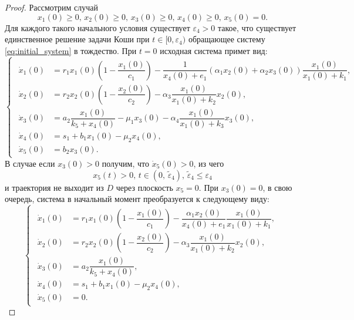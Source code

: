\documentclass[14pt,a4paper]{extarticle}
\begin{document}
\begin{proof}
		Рассмотрим случай 
		\begin{equation}\label{eq:conds_4}
			x_1(0)\ge0,\, x_2(0)\ge0,\, x_3(0)\ge0,\, x_4(0)\ge0,\, x_5(0)=0.
		\end{equation}
		Для каждого такого начального условия существует $\varepsilon_4>0$ такое, что существует единственное решение задачи Коши при $t\in[0,\varepsilon_4)$ обращающее систему \ref{eq:initial_system} в тождество. При $t=0$ исходная система примет вид:
		\begin{equation*}
			\begin{cases}
				\begin{aligned}
					\dot{x}_1(0) &= r_1x_1(0)\left(1-\dfrac{x_1(0)}{c_1}\right)-\dfrac{1}{x_4(0)+e_1}(\alpha_1x_2(0)+\alpha_2x_3(0))\dfrac{x_1(0)}{x_1(0)+k_1},\\
					\dot{x}_2(0) &= r_2x_2(0)\left(1-\dfrac{x_2(0)}{c_2}\right)-\alpha_3\dfrac{x_1(0)}{x_1(0)+k_2}x_2(0),\\
					\dot{x}_3(0) &= a_2\dfrac{x_1(0)}{k_5+x_4(0)}-\mu_1x_3(0)-\alpha_4\dfrac{x_1(0)}{x_1(0)+k_3}x_3(0),\\
					\dot{x}_4(0) &= s_1 + b_1x_1(0)-\mu_2x_4(0),\\
					\dot{x}_5(0) &= b_2x_3(0).
				\end{aligned}
			\end{cases}
		\end{equation*}
		В случае если $x_3(0)>0$ получим, что $\dot{x}_5(0)>0$, из чего 
		\[x_5(t)>0,\, t\in(0,\, \tilde{\varepsilon}_4),\,\tilde{\varepsilon}_4\le\varepsilon_4\]
		и траектория не выходит из $D$ через плоскость $x_5=0$. При $x_3(0)=0$, в свою очередь, система в начальный момент преобразуется к следующему виду:
		\begin{equation*}
			\begin{cases}
				\begin{aligned}
					\dot{x}_1(0) &= r_1x_1(0)\left(1-\dfrac{x_1(0)}{c_1}\right)-\dfrac{\alpha_1x_2(0)}{x_4(0)+e_1}\dfrac{x_1(0)}{x_1(0)+k_1},\\
					\dot{x}_2(0) &= r_2x_2(0)\left(1-\dfrac{x_2(0)}{c_2}\right)-\alpha_3\dfrac{x_1(0)}{x_1(0)+k_2}x_2(0),\\
					\dot{x}_3(0) &= a_2\dfrac{x_1(0)}{k_5+x_4(0)},\\
					\dot{x}_4(0) &= s_1 + b_1x_1(0)-\mu_2x_4(0),\\
					\dot{x}_5(0) &= 0.
				\end{aligned}
			\end{cases}
		\end{equation*} 

\end{proof}
\end{document}
